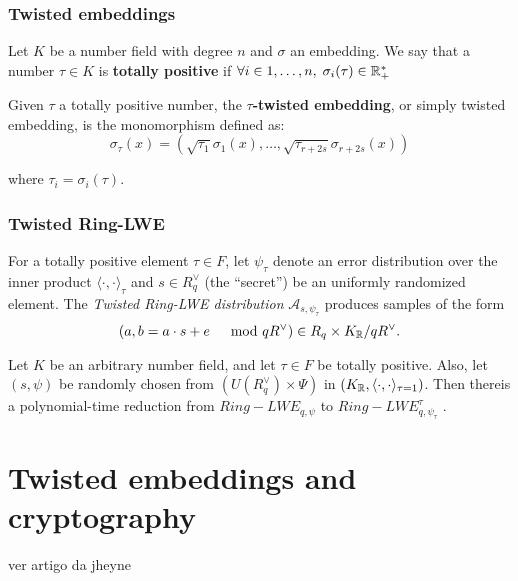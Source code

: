 \documentclass[Ingles]{ic-tese-v3}
\begin{document}
\subsection{Twisted embeddings}
\label{sec:org2ad623f}

\begin{definition}
Let $K$ be a number field with degree $n$ and $\sigma$ an embedding. We say that a number $\tau \in K$ is
\textbf{totally  positive} if $\forall i \in {1, \dots , n}, \; \sigma_i(\tau) \in \mathbb{R}^*_+$ 
\end{definition}


\begin{definition}
  \label{def:twisted-emb}
  Given $\tau$ a totally positive number, the \textbf{$\tau$-twisted embedding}, or
  simply twisted embedding, is the monomorphism defined as:
  \begin{equation*}
    \sigma_\tau(x) = \left( \sqrt{\tau_1}\sigma_1(x), \dots, \sqrt{\tau_{r+2s}}\sigma_{r+2s}(x) \right)
  \end{equation*}

  where $\tau_i = \sigma_i(\tau)$.
\end{definition}

\subsection{Twisted Ring-LWE}
\label{sec:orgbf1ad13}
\begin{definition}
  \label{def:twisted-ring-lwe}
  For a totally positive element $\tau \in F$, let $\psi_\tau$ denote an error distribution
  over the inner product $\langle{\cdot,\cdot}\rangle_\tau$ and $s \in R^\vee_q$ (the “secret”) be an
  uniformly randomized element. The \emph{Twisted Ring-LWE distribution}
  $\mathcal{A}_{s,\psi_\tau}$ produces samples of the form
  $$
  (a, b = a \cdot s + e \;\;\; \mod{qR^\vee}) \in R_q \times K_{\mathbb{R}}/qR^\vee.
  $$
\end{definition}
\begin{theorem}
  Let $K$ be an arbitrary number field, and let $\tau \in F$ be totally positive.
  Also, let $(s,\psi)$ be randomly chosen from $(U(R_q^\vee)\times \Psi)$ in $(K_{\mathbb{R}},\langle{\cdot,\cdot}\rangle_{\tau=1})$.
  Then thereis a polynomial-time reduction from $Ring-LWE_{q,\psi}$ to $Ring-LWE^\tau_{q,\psi_\tau}$ .
\end{theorem}
\chapter{Twisted embeddings and cryptography}
\label{sec:orge285cd7}
ver artigo da jheyne
\end{document}
